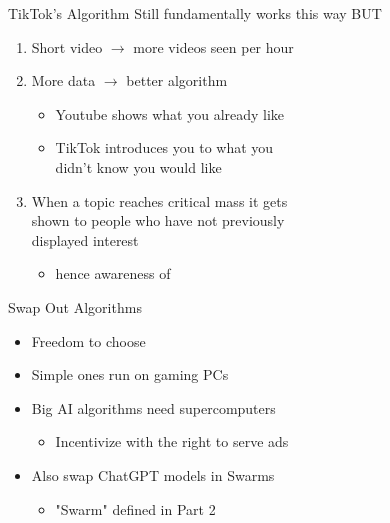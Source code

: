 \documentclass[aspectratio=35]{beamer} %
\begin{document}
\begin{frame}{TikTok's Algorithm}
\vspace{-1.2in}
\tiny
\hspace{0.2in} Still fundamentally works this way BUT
\begin{enumerate}
    \item Short video $\rightarrow$ more videos seen per hour
    \item More data $\rightarrow$ better algorithm
    \begin{itemize}
        \item Youtube shows what you already like
        \item TikTok introduces you to what you\\didn't know you would like
    \end{itemize}
    \item When a topic reaches critical mass it gets\\shown to people who have not previously\\displayed interest
    \begin{itemize}\item hence awareness of \end{itemize}
\end{enumerate}
\end{frame}

\begin{frame}{Swap Out Algorithms}
\vspace{-1.6in}
\begin{itemize}
    \item Freedom to choose
    \item Simple ones run on gaming PCs
    \item Big AI algorithms need supercomputers
    \begin{itemize}
        \item Incentivize with the right to serve ads
    \end{itemize}
    \item Also swap ChatGPT models in Swarms
    \begin{itemize}
        \item "Swarm" defined in Part 2
    \end{itemize}
\end{itemize}
\end{frame}
\end{document}
